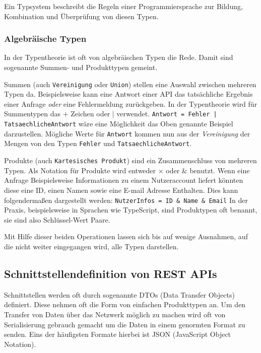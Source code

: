 Ein Typsystem beschreibt die Regeln einer Programmiersprache zur Bildung, Kombination und Überprüfung von diesen Typen.

\subsubsection{Algebräische Typen} \label{sec:algebraic-types}

In der Typentheorie ist oft von algebräischen Typen die Rede. Damit sind sogenannte Summen- und Produkttypen gemeint.

Summen (auch \texttt{Vereinigung} oder \texttt{Union}) stellen eine Auswahl zwischen mehreren Typen da. Beispielsweise kann eine Antwort einer API das tatsächliche
Ergebnis einer Anfrage \textit{oder} eine Fehlermeldung zurückgeben. In der Typentheorie wird für Summentypen das $+$ Zeichen oder $|$ verwendet.
\lstinline{Antwort = Fehler | TatsaechlicheAntwort} wäre eine Möglichkeit das Oben genannte Beispiel darzustellen.
Mögliche Werte für \lstinline{Antwort} kommen nun aus der \textit{Vereinigung} der Mengen von den Typen 
\lstinline{Fehler} und \lstinline{TatsaechlicheAntwort}.

Produkte (auch \texttt{Kartesisches Produkt}) sind ein Zusammenschluss von mehreren Typen.
Als Notation für Produkte wird entweder $\times$ oder $\&$ benutzt.
Wenn eine Anfrage Beispielsweise Informationen zu einem Nutzeraccount liefert könnten
diese eine ID, einen Namen sowie eine E-mail Adresse Enthalten.
Dies kann folgendermaßen dargestellt werden: \lstinline{NutzerInfos = ID & Name & Email}
In der Praxis, beispielsweise in Sprachen wie TypeScript, sind Produktypen oft benannt, sie sind also Schlüssel-Wert Paare.

Mit Hilfe dieser beiden Operationen lassen sich bis auf wenige Ausnahmen, auf die nicht weiter eingegangen wird, alle Typen darstellen.

\subsection{Schnittstellendefinition von REST APIs}

Schnittstellen werden oft durch sogenannte DTOs (Data Transfer Objects) definiert. Diese nehmen oft die Form von einfachen Produkttypen an.
Um den Transfer von Daten über das Netzwerk möglich zu machen wird oft von Serialisierung gebrauch gemacht um die Daten in einem genormten 
Format zu senden. Eins der häufigsten Formate hierbei ist JSON (JavaScript Object Notation).

